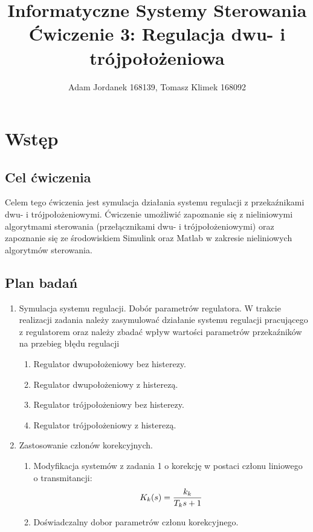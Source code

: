\documentclass[a4paper,10pt]{article}
\title{Informatyczne Systemy Sterowania \\ \large Ćwiczenie 3: Regulacja dwu- i trójpołożeniowa}
\author{Adam Jordanek 168139, Tomasz Klimek 168092}
\begin{document}
\maketitle

\section{Wstęp}\label{sec:wstęp}
\subsection{Cel ćwiczenia}
Celem tego ćwiczenia jest symulacja działania systemu regulacji z przekaźnikami dwu- i trójpołożeniowymi. Ćwiczenie umożliwić zapoznanie się z nieliniowymi algorytmami sterowania (przełącznikami dwu- i trójpołożeniowymi) oraz zapoznanie się ze środowiskiem Simulink oraz Matlab w zakresie nieliniowych algorytmów sterowania.

\subsection{Plan badań} 
\begin{enumerate}
	\item Symulacja systemu regulacji. Dobór parametrów regulatora. \newline
	 \small {W trakcie realizacji zadania należy zasymulować działanie systemu regulacji pracującego z regulatorem oraz należy zbadać wpływ wartości parametrów przekaźników na przebieg błędu regulacji}
	\begin{enumerate}
		\item Regulator dwupołożeniowy bez histerezy.
		\item Regulator dwupołożeniowy z histerezą.
		\item Regulator trójpołożeniowy bez histerezy.
		\item Regulator trójpołożeniowy z histerezą.
 	\end{enumerate}
	\item Zastosowanie członów korekcyjnych.
	\begin{enumerate}
		\item Modyfikacja systemów z zadania 1 o korekcję w postaci członu liniowego o transmitancji: 
			\begin{equation} \label{eqn:czlonKorekcyjny}
				K_{k}(s) = {{k_{k}} \over {T_{k}s+1}}
			\end{equation}
		\item Doświadczalny dobor parametrów członu korekcyjnego.
	\end{enumerate}
\end{enumerate}
\end{document}
